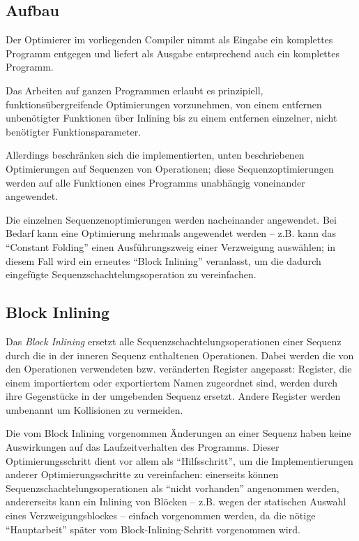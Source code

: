 \documentclass[twoside,a4paper,fleqn,12pt]{book}
\begin{document}
\subsection{Aufbau}


Der Optimierer im vorliegenden Compiler nimmt als Eingabe ein komplettes Programm entgegen
und liefert als Ausgabe entsprechend auch ein komplettes Programm.

Das Arbeiten auf ganzen Programmen erlaubt es prinzipiell, funktionsübergreifende Optimierungen
vorzunehmen, von einem entfernen unbenötigter Funktionen über Inlining bis zu einem entfernen
einzelner, nicht benötigter Funktionsparameter.

Allerdings beschränken sich die implementierten, unten beschriebenen Optimierungen auf Sequenzen
von Operationen; diese Sequenzoptimierungen werden auf alle Funktionen eines Programms unabhängig
voneinander angewendet.

Die einzelnen Sequenzenoptimierungen werden nacheinander angewendet. Bei Bedarf kann eine
Optimierung mehrmals angewendet werden -- z.B. kann das ``Constant Folding'' einen Ausführungszweig
einer Verzweigung auswählen; in diesem Fall wird ein erneutes ``Block Inlining'' veranlasst,
um die dadurch eingefügte Sequenzschachtelungsoperation zu vereinfachen.

\subsection{Block Inlining}

Das \emph{Block Inlining} ersetzt alle Sequenzschachtelungsoperationen einer Sequenz durch
die in der inneren Sequenz enthaltenen Operationen. Dabei werden die von den
Operationen verwendeten bzw. veränderten Register angepasst: Register, die einem importiertem
oder exportiertem Namen zugeordnet sind, werden durch ihre Gegenstücke in der umgebenden
Sequenz ersetzt. Andere Register werden umbenannt um Kollisionen zu vermeiden.

Die vom Block Inlining vorgenommen Änderungen an einer Sequenz haben keine Auswirkungen auf das
Laufzeitverhalten des Programms. Dieser Optimierungsschritt dient vor allem als "`Hilfsschritt"',
um die Implementierungen anderer Optimierungsschritte zu vereinfachen: einerseits können
Sequenzschachtelungsoperationen als "`nicht vorhanden"' angenommen werden, andererseits kann
ein Inlining von Blöcken -- z.B. wegen der statischen Auswahl eines Verzweigungsblockes --
einfach vorgenommen werden, da die nötige "`Hauptarbeit"' später vom Block-Inlining-Schritt
vorgenommen wird.
\end{document}
